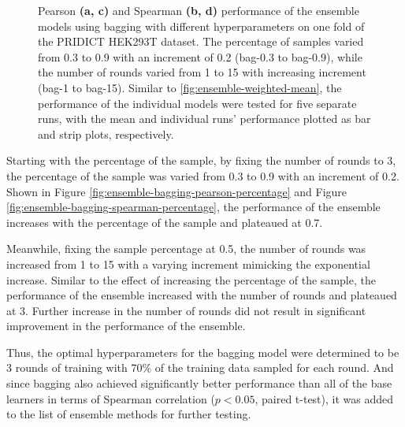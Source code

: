 \begin{figure}
    \centering
    \caption[Ensemble Model Performance]{Pearson \textbf{(a, c)} and Spearman \textbf{(b, d)} performance of the ensemble models using bagging with different hyperparameters on one fold of the PRIDICT HEK293T dataset. The percentage of samples varied from 0.3 to 0.9 with an increment of 0.2 (bag-0.3 to bag-0.9), while the number of rounds varied from 1 to 15 with increasing increment (bag-1 to bag-15). Similar to \autoref{fig:ensemble-weighted-mean}, the performance of the individual models were tested for five separate runs, with the mean and individual runs' performance plotted as bar and strip plots, respectively.}
    \label{fig:ensemble-bagging-tuning}
\end{figure}

Starting with the percentage of the sample, by fixing the number of rounds to 3, the percentage of the sample was varied from 0.3 to 0.9 with an increment of 0.2. Shown in Figure \ref{fig:ensemble-bagging-pearson-percentage} and Figure \ref{fig:ensemble-bagging-spearman-percentage}, the performance of the ensemble increases with the percentage of the sample and plateaued at 0.7. 

Meanwhile, fixing the sample percentage at 0.5, the number of rounds was increased from 1 to 15 with a varying increment mimicking the exponential increase. Similar to the effect of increasing the percentage of the sample, the performance of the ensemble increased with the number of rounds and plateaued at 3. Further increase in the number of rounds did not result in significant improvement in the performance of the ensemble.

Thus, the optimal hyperparameters for the bagging model were determined to be 3 rounds of training with 70\% of the training data sampled for each round. And since bagging also achieved significantly better performance than all of the base learners in terms of Spearman correlation ($p<0.05$, paired t-test), it was added to the list of ensemble methods for further testing.

